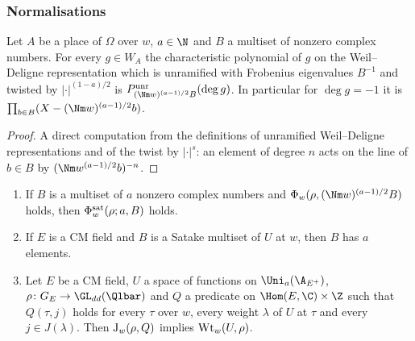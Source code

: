 \subsubsection{Normalisations}

\begin{lemma}\label{pf:geo:satpol}
Let $A$ be a place of $\Omega$ over $w$, $a\in\N$ and $B$ a multiset of nonzero complex numbers. For every
$g\in W_A$ the characteristic polynomial of $g$ on the Weil--Deligne representation which is unramified
with Frobenius eigenvalues $B^{-1}$ and twisted by $|\cdot|^{(1-a)/2}$ is $\geounr_{(\Nm w)^{(a-1)/2}B}(\deg g)$.
In particular for $\deg g=-1$ it is $\prod_{b\in B}(X-(\Nm w)^{(a-1)/2}b)$.
\end{lemma}

\begin{proof}
A direct computation from the definitions of unramified Weil--Deligne representations and of the twist
by $|\cdot|^s$: an element of degree $n$ acts on the line of $b\in B$ by $(\Nm w^{(a-1)/2}b)^{-n}$.
\end{proof}

\begin{proposition}[(S11)--(S13)]\label{pf:geo:norms}
\begin{enumerate}[label=\textup{(S\arabic*)},start=11,nosep]
\item If $B$ is a multiset of $a$ nonzero complex numbers and $\geoPhiK_w(\rho,(\Nm w)^{(a-1)/2}B)$ holds, then
  $\Phi^{\mathrm{sat}}_w(\rho;a,B)$ holds.
\item If $E$ is a CM field and $B$ is a Satake multiset of $U$ at $w$, then $B$ has $a$ elements.
\item Let $E$ be a CM field, $U$ a space of functions on $\geoUa$, $\rho\colon G_E\to\GL_{dd}(\Qlbar)$ and $Q$ a
  predicate on $\Hom(E,\C)\times\Z$ such that $Q(\tau,j)$ holds for every $\tau$ over $w$, every weight $\lambda$
  of $U$ at $\tau$ and every $j\in J(\lambda)$. Then $\mathrm{J}_w(\rho,Q)$ implies $\mathrm{Wt}_w(U,\rho)$.
\end{enumerate}
\end{proposition}

